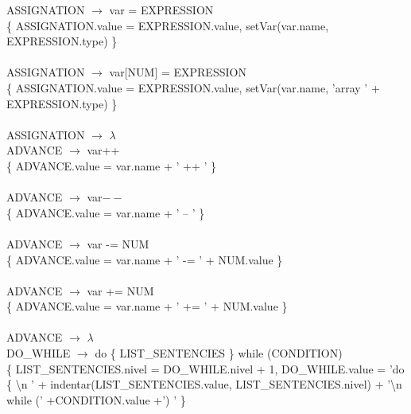 \documentclass[10pt,a4paper]{article}
\begin{document}
{{{ASSIGNATION $\rightarrow$ var = EXPRESSION \\  

\{ ASSIGNATION.value = EXPRESSION.value, setVar(var.name, EXPRESSION.type) \}  \\ \\

ASSIGNATION $\rightarrow$ var[NUM] = EXPRESSION  \\

\{ ASSIGNATION.value = EXPRESSION.value, setVar(var.name, 'array ' + EXPRESSION.type) \}  \\ \\

ASSIGNATION $\rightarrow$ $\lambda$ \\


ADVANCE $\rightarrow$ var++   \\

\{ ADVANCE.value = var.name + ' ++ ' \}  \\ \\


ADVANCE $\rightarrow$ var$--$   \\

\{ ADVANCE.value = var.name + ' -- ' \}  \\ \\


ADVANCE $\rightarrow$ var -= NUM  \\ 

\{ ADVANCE.value = var.name + ' -= ' + NUM.value \}  \\ \\


ADVANCE $\rightarrow$ var += NUM  \\

\{ ADVANCE.value = var.name + ' += ' + NUM.value \}  \\ \\


ADVANCE $\rightarrow$ $\lambda$ \\

DO\_WHILE $\rightarrow$ do \{ LIST\_SENTENCIES \} while (CONDITION) \\

\{ LIST\_SENTENCIES.nivel = DO\_WHILE.nivel + 1, DO\_WHILE.value = 'do \{ \textbackslash{}n ' +  indentar(LIST\_SENTENCIES.value, LIST\_SENTENCIES.nivel)  + '\textbackslash{}n while (' +CONDITION.value +') ' \} \\ \\



}}}
\end{document}
